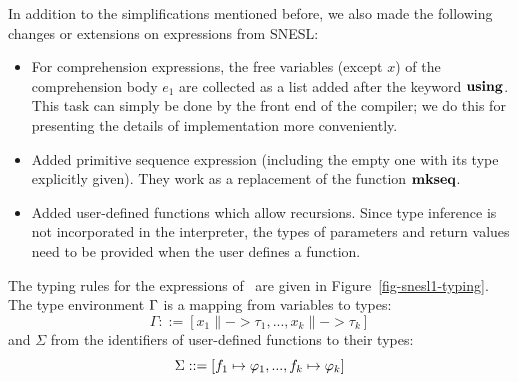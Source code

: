 In addition to the simplifications mentioned before, we also made the following changes or extensions on expressions from SNESL:

\begin{itemize}
	\item For comprehension expressions, the free variables (except $x$) of the comprehension body $e_1$  are collected as a list added after the keyword $\mathbf{using}$. This task can simply be done by the front end of the compiler; we do this for presenting the details of implementation more conveniently.
	
	\item Added primitive sequence expression (including the empty one with its type explicitly given). They work as a replacement of the function $\mathbf{mkseq}$.
	
	\item Added user-defined functions which allow recursions. Since type inference is not incorporated in the interpreter, the types of  parameters and return values need to be provided when the user defines a function.
\end{itemize}


The typing rules for the expressions of \mysnesl \ are given in Figure~\ref{fig-snesl1-typing}. The type environment $\Gamma$ is a mapping from variables to types: $$\Gamma ::= [x_1 \|-> \tau_1, ..., x_k \|-> {\tau_k} ]$$
and $\Sigma$ from the identifiers of user-defined functions  to their types: 
$$\Sigma ::= [f_1 \|-> \ftype_1,..., f_k  \|-> \ftype_k ]$$

